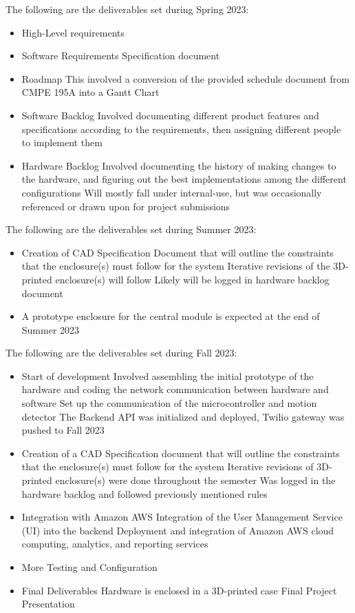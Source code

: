 The following are the deliverables set during Spring 2023:
\begin{itemize}
    \item High-Level requirements
    \item Software Requirements Specification document
    \item Roadmap
    \subitem This involved a conversion of the provided schedule document from CMPE 195A into a Gantt Chart
    \item Software Backlog
    \subitem Involved documenting different product features and specifications according to the requirements, then assigning different people to implement them
    \item Hardware Backlog
    \subitem Involved documenting the history of making changes to the hardware, and figuring out the best implementations among the different configurations
    \subitem Will mostly fall under internal-use, but was occasionally referenced or drawn upon for project submissions
\end{itemize}

The following are the deliverables set during Summer 2023:
\begin{itemize}
    \item Creation of CAD Specification Document that will outline the
    constraints that the enclosure(s) must follow for the system
    \subitem Iterative revisions of the 3D-printed enclosure(s) will follow
    \subsubitem Likely will be logged in hardware backlog document
    \item A prototype enclosure for the central module is expected at the end of Summer 2023
\end{itemize}

The following are the deliverables set during Fall 2023:
\begin{itemize}
    \item Start of development
    \subitem Involved assembling the initial prototype of the hardware and coding
    the network communication between hardware and software
    \subitem Set up the communication of the microcontroller and motion detector
    \subitem The Backend API was initialized and deployed, Twilio gateway was pushed to Fall 2023
    \item Creation of a CAD Specification document that will outline the constraints
    that the enclosure(s) must follow for the system
    \subitem Iterative revisions of 3D-printed enclosure(s) were done throughout the
    semester
    \subitem Was logged in the hardware backlog and followed previously mentioned rules
    \item Integration with Amazon AWS
    \subitem Integration of the User Management Service (UI) into the backend
    \subitem Deployment and integration of Amazon AWS cloud computing,
    analytics, and reporting services
    \item More Testing and Configuration
    \item Final Deliverables
    \subitem Hardware is enclosed in a 3D-printed case
    \subitem Final Project Presentation
\end{itemize}